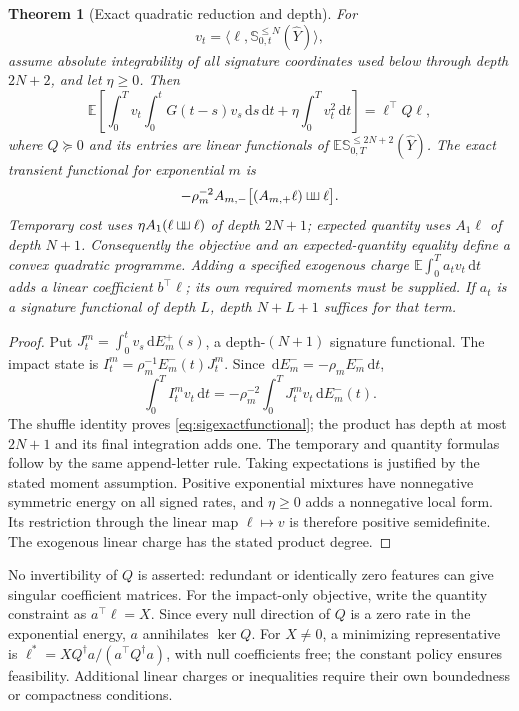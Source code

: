 \documentclass[11pt]{article}
\numberwithin{equation}{section}
\newtheorem{theorem}{Theorem}[section]
\theoremstyle{definition}
\theoremstyle{remark}
\newcommand{\E}{\mathbb{E}}
\theoremstyle{definition}
\newcommand{\dd}{\,\mathrm d}
\newcommand{\shuffle}{\mathbin{\sqcup\mkern-6mu\sqcup}}
\begin{document}
\begin{theorem}[Exact quadratic reduction and depth]\label{thm:sigquadratic}
For
\begin{equation}\label{eq:exogpolicy}
 v_t=\langle\ell,\mathbb S^{\le N}_{0,t}(\widehat Y)\rangle,
\end{equation}
assume absolute integrability of all signature coordinates used below through
depth $2N+2$, and let $\eta\ge0$. Then
\begin{equation}\label{eq:sigquad}
 \E\left[\int_0^T v_t\int_0^tG(t-s)v_s\dd s\dd t
                  +\eta\int_0^T v_t^2\dd t\right]
 =\ell^\top Q\ell,
\end{equation}
where $Q\succeq0$ and its entries are linear functionals of
$\E\mathbb S^{\le 2N+2}_{0,T}(\widehat Y)$. The exact transient functional
for exponential $m$ is
\begin{equation}\label{eq:sigexactfunctional}
 -\rho_m^{-2}A_{m,-}\bigl[(A_{m,+}\ell)\shuffle\ell\bigr].
\end{equation}
Temporary cost uses $\eta A_1(\ell\shuffle\ell)$ of depth $2N+1$;
expected quantity uses $A_1\ell$ of depth $N+1$. Consequently the objective
and an expected-quantity equality define a convex quadratic programme.
Adding a specified exogenous charge $\E\int_0^T a_tv_t\dd t$ adds a
linear coefficient $b^\top\ell$; its own required moments must be supplied.
If $a_t$ is a signature functional of depth $L$, depth $N+L+1$ suffices
for that term.
\end{theorem}
\begin{proof}
Put $J_t^m=\int_0^t v_s\dd E_m^+(s)$, a depth-$(N+1)$ signature
functional. The impact state is
$I_t^m=\rho_m^{-1}E_m^-(t)J_t^m$. Since
$\dd E_m^-=-\rho_m E_m^-\dd t$,
\[
 \int_0^T I_t^m v_t\dd t
 =-\rho_m^{-2}\int_0^T J_t^m v_t\dd E_m^-(t).
\]
The shuffle identity proves \eqref{eq:sigexactfunctional}; the product has
depth at most $2N+1$ and its final integration adds one. The temporary and
quantity formulas follow by the same append-letter rule. Taking expectations
is justified by the stated moment assumption. Positive exponential mixtures
have nonnegative symmetric energy on all signed rates, and $\eta\ge0$ adds
a nonnegative local form. Its restriction through the linear map
$\ell\mapsto v$ is therefore positive semidefinite. The exogenous linear
charge has the stated product degree.
\end{proof}

No invertibility of $Q$ is asserted: redundant or identically zero features
can give singular coefficient matrices. For the impact-only objective, write
the quantity constraint as $a^\top\ell=X$. Since every null direction of
$Q$ is a zero rate in the exponential energy, $a$ annihilates $\ker Q$.
For $X\ne0$, a minimizing representative is
$\ell^*=XQ^\dagger a/(a^\top Q^\dagger a)$, with null coefficients free;
the constant policy ensures feasibility. Additional linear charges or
inequalities require their own boundedness or compactness conditions.
\end{document}
